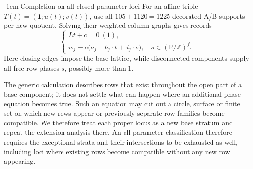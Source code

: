 \documentclass[11pt,a4paper]{article}
\makeatletter
\theoremstyle{plain}
\theoremstyle{definition}
\numberwithin{equation}{section}
\renewcommand\subsection{\@startsection{subsection}{2}{\z@}  {\medskipamount}  {-1em}  {\normalfont\normalsize\bfseries}}
\makeatother
\begin{document}
\subsection{Completion on all closed parameter loci}\label{sec:fullABmethod}
For an affine triple $T(t)=(\mathbf1;u(t);v(t))$, use all $105+1120=1225$ decorated A/B supports per new quotient. Solving their weighted column graphs gives records
\begin{equation}\label{eq:fullrowrecord}
 \left\{\begin{array}{l}
 Lt+c=0\ (1),\\
 w_j=e\bigl(a_j+b_j\cdot t+d_j\cdot s\bigr),
 \quad s\in(\mathbb{R}/\mathbb{Z})^f.
 \end{array}\right.
\end{equation}
Here closing edges impose the base lattice, while disconnected components supply all free row phases $s$, possibly more than $1$.

The generic calculation describes rows that exist throughout the open part of a base component; it does not settle what can happen where an additional phase equation becomes true. Such an equation may cut out a circle, surface or finite set on which new rows appear or previously separate row families become compatible. We therefore treat each proper locus as a new base stratum and repeat the extension analysis there. An all-parameter classification therefore requires the exceptional strata and their intersections to be exhausted as well, including loci where existing rows become compatible without any new row appearing.
\end{document}
